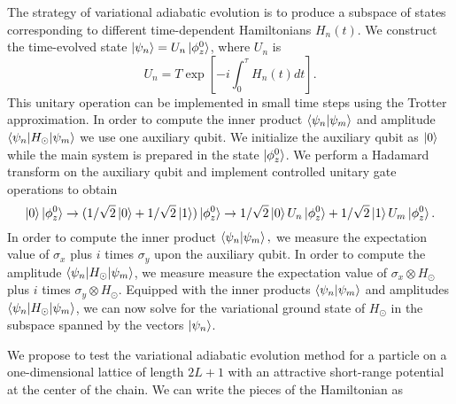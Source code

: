 \documentclass[11pt]{article}
\begin{document}
The strategy of variational adiabatic evolution is to produce a
subspace of states corresponding to different time-dependent
Hamiltonians $H_{n}(t)$.  We construct the time-evolved state
$\ket{\psi_n} = U_n\ket{\phi_z^0}$, where $U_n$ is
\begin{equation}
U_n = T \exp\left[-i\int_0^\tau H_n(t) dt \right] \label{adiabatic}.
\end{equation}
 This unitary operation can be implemented in small time steps using
 the Trotter approximation. In order to compute the inner product
 $\braket{\psi_n|\psi_m}$ and amplitude
 $\braket{\psi_n|H_\odot|\psi_m}$ we use one auxiliary qubit.  We
 initialize the auxiliary qubit as $\ket{0}$ while the main system is
 prepared in the state $\ket{\phi_z^0}$.  We perform a Hadamard
 transform on the auxiliary qubit and implement controlled unitary
 gate operations to obtain
\begin{equation}
\ket{0}\ket{\phi_z^0} \rightarrow (1/\sqrt{2}\ket{0} +1/\sqrt{2}\ket{1})\ket{\phi_z^0}
\rightarrow 1/\sqrt{2}\ket{0}U_n\ket{\phi_z^0} +1/\sqrt{2}\ket{1}U_m\ket{\phi_z^0}.
\end{equation}
In order to compute the inner product $\braket{\psi_n|\psi_m},$ we
measure the expectation value of $\sigma_x$ plus $i$ times $\sigma_y$
upon the auxiliary qubit.  In order to compute the amplitude
$\braket{\psi_n|H_\odot|\psi_m}$, we measure measure the expectation
value of $\sigma_x \otimes H_\odot$ plus $i$ times $\sigma_y \otimes
H_\odot$.  Equipped with the inner products $\braket{\psi_n|\psi_m}$
and amplitudes $\braket{\psi_n|H_\odot|\psi_m}$, we can now solve for
the variational ground state of $H_\odot$ in the subspace spanned by
the vectors $\ket{\psi_n}$.

We propose to test the variational adiabatic evolution method for a
particle on a one-dimensional lattice of length $2L+1$ with an
attractive short-range potential at the center of the chain.  We can
write the pieces of the Hamiltonian as
\end{document}
